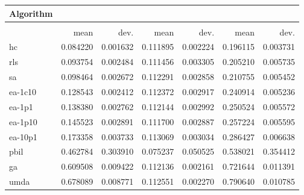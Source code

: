 \begin{tabular}{@{} l *{6}{>{{}}N{1}{2}} @{}}
\toprule
{Algorithm} &  \\
\midrule
&  &  &  \\
\midrule
& {mean} & {dev.} & {mean} & {dev.} & {mean} & {dev.} \\
\midrule
hc & 0.084220 & 0.001632 & 0.111895 & 0.002224 & 0.196115 & 0.003731 \\
rls & 0.093754 & 0.002484 & 0.111456 & 0.003305 & 0.205210 & 0.005735 \\
sa & 0.098464 & 0.002672 & 0.112291 & 0.002858 & 0.210755 & 0.005452 \\
ea-1c10 & 0.128543 & 0.002412 & 0.112372 & 0.002917 & 0.240914 & 0.005236 \\
ea-1p1 & 0.138380 & 0.002762 & 0.112144 & 0.002992 & 0.250524 & 0.005572 \\
ea-1p10 & 0.145523 & 0.002891 & 0.111700 & 0.002887 & 0.257224 & 0.005595 \\
ea-10p1 & 0.173358 & 0.003733 & 0.113069 & 0.003034 & 0.286427 & 0.006638 \\
pbil & 0.462784 & 0.303910 & 0.075237 & 0.050525 & 0.538021 & 0.354412 \\
ga & 0.609508 & 0.009422 & 0.112136 & 0.002161 & 0.721644 & 0.011391 \\
umda & 0.678089 & 0.008771 & 0.112551 & 0.002270 & 0.790640 & 0.010785 \\
\bottomrule
\end{tabular}
